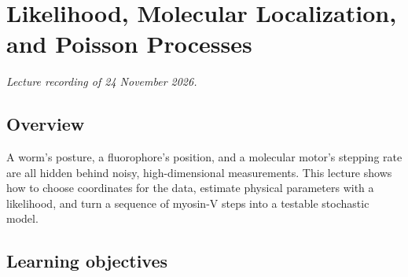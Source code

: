 
\chapter{Likelihood, Molecular Localization, and Poisson Processes}
\label{chap:l06-inference}
\textit{Lecture recording of 24 November 2026.}

\section*{Overview}

A worm's posture, a fluorophore's position, and a molecular motor's stepping rate are all hidden behind noisy, high-dimensional measurements. This lecture shows how to choose coordinates for the data, estimate physical parameters with a likelihood, and turn a sequence of myosin-V steps into a testable stochastic model.

\section*{Learning objectives}

